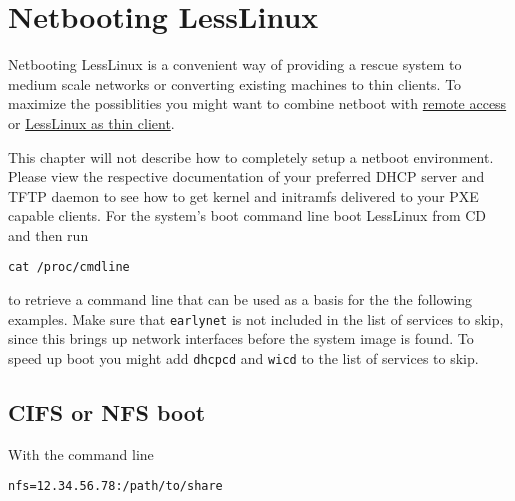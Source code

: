 

\section{Netbooting LessLinux}

Netbooting LessLinux is a convenient way of providing a rescue system to medium scale networks or converting existing machines to thin clients. To maximize the possiblities you might want to combine netboot with \hyperlink{remote}{remote access} or \hyperlink{thinclient}{LessLinux as thin client}.  

This chapter will not describe how to completely setup a netboot environment. Please view the respective documentation of your preferred DHCP server and TFTP daemon to see how to get kernel and initramfs delivered to your PXE capable clients. For the system's boot command line boot LessLinux from CD and then run

\begin{verbatim}
cat /proc/cmdline
\end{verbatim}

to retrieve a command line that can be used as a basis for the the following examples. Make sure that \texttt{earlynet} is not included in the list of services to skip, since this brings up network interfaces before the system image is found. To speed up boot you might add \texttt{dhcpcd} and \texttt{wicd} to the list of services to skip.


\subsection{CIFS or NFS boot}

With the command line

\begin{verbatim}
nfs=12.34.56.78:/path/to/share
\end{verbatim}

